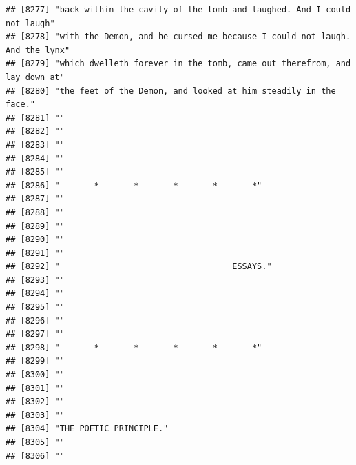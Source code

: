 \documentclass{article}\usepackage[]{graphicx}\usepackage[]{color}
\makeatletter
\newenvironment{kframe}{%
 \def\at@end@of@kframe{}%
 \ifinner\ifhmode%
  \def\at@end@of@kframe{\end{minipage}}%
  \begin{minipage}{\columnwidth}%
 \fi\fi%
 \def\FrameCommand##1{\hskip\@totalleftmargin \hskip-\fboxsep
 \colorbox{shadecolor}{##1}\hskip-\fboxsep
     \hskip-\linewidth \hskip-\@totalleftmargin \hskip\columnwidth}%
 \MakeFramed {\advance\hsize-\width
   \@totalleftmargin\z@ \linewidth\hsize
   \@setminipage}}%
 {\par\unskip\endMakeFramed%
 \at@end@of@kframe}
\newenvironment{knitrout}{}{} %
\makeatother
\begin{document}
\begin{knitrout}
\begin{kframe}
\begin{verbatim}
## [8277] "back within the cavity of the tomb and laughed. And I could not laugh"       
## [8278] "with the Demon, and he cursed me because I could not laugh. And the lynx"    
## [8279] "which dwelleth forever in the tomb, came out therefrom, and lay down at"     
## [8280] "the feet of the Demon, and looked at him steadily in the face."              
## [8281] ""                                                                            
## [8282] ""                                                                            
## [8283] ""                                                                            
## [8284] ""                                                                            
## [8285] ""                                                                            
## [8286] "       *       *       *       *       *"                                    
## [8287] ""                                                                            
## [8288] ""                                                                            
## [8289] ""                                                                            
## [8290] ""                                                                            
## [8291] ""                                                                            
## [8292] "                                   ESSAYS."                                  
## [8293] ""                                                                            
## [8294] ""                                                                            
## [8295] ""                                                                            
## [8296] ""                                                                            
## [8297] ""                                                                            
## [8298] "       *       *       *       *       *"                                    
## [8299] ""                                                                            
## [8300] ""                                                                            
## [8301] ""                                                                            
## [8302] ""                                                                            
## [8303] ""                                                                            
## [8304] "THE POETIC PRINCIPLE."                                                       
## [8305] ""                                                                            
## [8306] ""                                                                            

\end{verbatim}
\end{kframe}
\end{knitrout}
\end{document}
